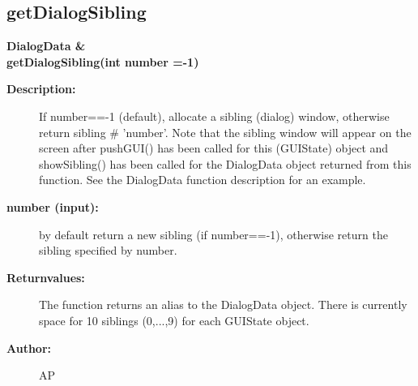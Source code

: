 \subsection{getDialogSibling}
 
\begin{flushleft} \textbf{%
DialogData \&  \\ 
\settowidth{\GUIStateIncludeArgIndent}{getDialogSibling(}%
getDialogSibling(int number  =-1)
}\end{flushleft}
\begin{description}
\item[{\bf Description:}]  If number==-1 (default), allocate a sibling (dialog) window, otherwise return
   sibling \# 'number'. Note that the sibling window
 will appear on the screen after pushGUI() has been called for this (GUIState) object 
 and showSibling() has been called for the DialogData object returned from this function.
 See the DialogData function description for an example.

\item[{\bf number (input):}]  by default return a new sibling (if number==-1), otherwise return the
    sibling specified by number.
\item[{\bf Returnvalues:}]  The function returns an alias to the DialogData object. There 
  is currently space for 10 siblings (0,...,9) for each GUIState object.

\item[{\bf Author:}]  AP
\end{description}
